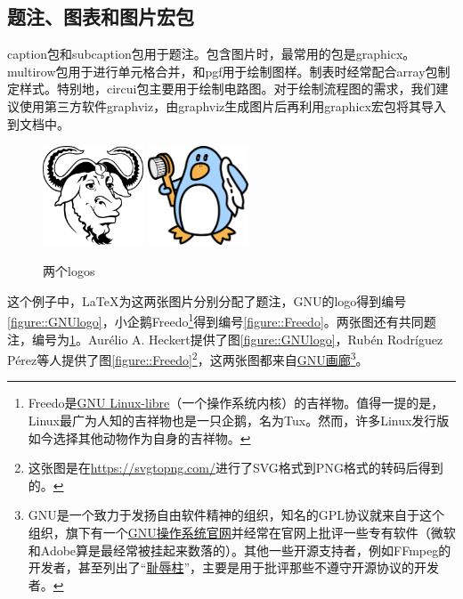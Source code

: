 \subsection{题注、图表和图片宏包}

caption包和subcaption包用于题注。包含图片时，最常用的包是graphicx。multirow包用于进行单元格合并，\TikZ 和pgf用于绘制图样。制表时经常配合array包制定样式。特别地，circui\TikZ 包主要用于绘制电路图。对于绘制流程图的需求，我们建议使用第三方软件graphviz，由graphviz生成图片后再利用graphicx宏包将其导入到文档中。

\begin{figure}[H]
	\centering
		{\includegraphics[height = 3cm, width = 3cm]{contents/assets/img/GNU_logo.png}}
		{\includegraphics[height = 3cm, width = 3cm]{contents/assets/img/Freedo.png}}
	\caption{两个logos}\label{figure::two_logos}
\end{figure}

这个例子中，\LaTeX 为这两张图片分别分配了题注，GNU的logo得到编号\ref*{figure::GNUlogo}，小企鹅Freedo\footnote{Freedo是\href{http://www.fsfla.org/ikiwiki/selibre/linux-libre/}{GNU Linux-libre}（一个操作系统内核）的吉祥物。值得一提的是，Linux最广为人知的吉祥物也是一只企鹅，名为Tux。然而，许多Linux发行版如今选择其他动物作为自身的吉祥物。}得到编号\ref*{figure::Freedo}。两张图还有共同题注，编号为\ref*{figure::two_logos}。Aur\'elio A. Heckert提供了图\ref*{figure::GNUlogo}，Rub\'en Rodr\'iguez P\'erez等人提供了图\ref*{figure::Freedo}\footnote{这张图是在\url{https://svgtopng.com/}进行了SVG格式到PNG格式的转码后得到的。}，这两张图都来自\href{https://www.gnu.org/graphics/graphics.html}{GNU画廊}\footnote{GNU是一个致力于发扬自由软件精神的组织，知名的GPL协议就来自于这个组织，旗下有一个\href{https://www.gnu.org/gnu/gnu.html}{GNU操作系统官网}并经常在官网上批评一些专有软件（微软和Adobe算是最经常被挂起来数落的）。其他一些开源支持者，例如FFmpeg的开发者，甚至列出了“\href{https://github.com/FFmpeg/web/blob/master/src/shame}{耻辱柱}”，主要是用于批评那些不遵守开源协议的开发者。}。

